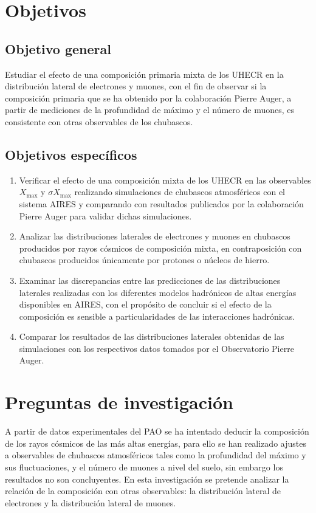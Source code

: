 \section{Objetivos}
	\subsection*{Objetivo general}
	Estudiar el efecto de una composición primaria mixta de los UHECR en la distribución lateral de electrones y muones, con el fin de observar si la composición primaria que se ha obtenido por la colaboración Pierre Auger, a partir de mediciones de la profundidad de máximo y el número de muones, es consistente con otras observables de los chubascos.	

	\subsection*{Objetivos específicos}	
	\begin{enumerate}
	\item Verificar el efecto de una composición mixta de los UHECR en las observables $X_{\text{max}}$ y $\sigma X_{\text{max}}$ realizando simulaciones de chubascos atmosféricos con el sistema AIRES y comparando con resultados publicados por la colaboración Pierre Auger para validar dichas simulaciones.
	
	\item Analizar las distribuciones laterales de electrones y muones en chubascos producidos por rayos cósmicos de composición mixta, en contraposición con chubascos producidos únicamente por protones o núcleos de hierro.
	
	\item Examinar las discrepancias entre las predicciones de las distribuciones laterales realizadas con los diferentes modelos hadrónicos de altas energías disponibles en AIRES, con el propósito de concluir si el efecto de la composición es sensible a particularidades de las interacciones hadrónicas.
	
	\item Comparar los resultados de las distribuciones laterales obtenidas de las simulaciones con los respectivos datos tomados por el Observatorio Pierre Auger.
	\end{enumerate}

\section{Preguntas de investigación}
A partir de datos experimentales del PAO se ha intentado deducir la composición de los rayos cósmicos de las más altas energías, para ello se han realizado ajustes a observables de chubascos atmosféricos tales como la profundidad del máximo y sus fluctuaciones, y el número de muones a nivel del suelo, sin embargo los resultados no son concluyentes. En esta investigación se pretende analizar la relación de la composición con otras observables: la distribución lateral de electrones y la distribución lateral de muones. \\

